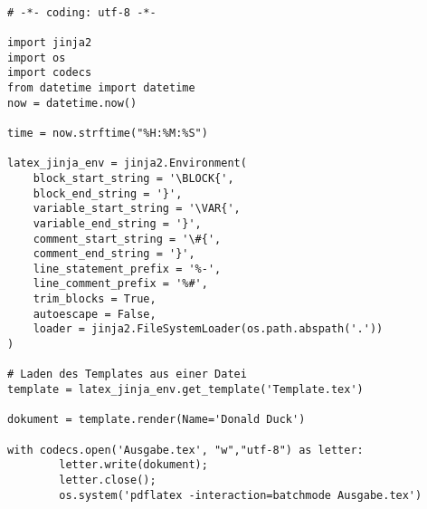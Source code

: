 \documentclass{article}
\begin{document}
\begin{verbatim}

# -*- coding: utf-8 -*-

import jinja2
import os
import codecs
from datetime import datetime
now = datetime.now()

time = now.strftime("%H:%M:%S")

latex_jinja_env = jinja2.Environment(
    block_start_string = '\BLOCK{',
    block_end_string = '}',
    variable_start_string = '\VAR{',
    variable_end_string = '}',
    comment_start_string = '\#{',
    comment_end_string = '}',
    line_statement_prefix = '%-',
    line_comment_prefix = '%#',
    trim_blocks = True,
    autoescape = False,
    loader = jinja2.FileSystemLoader(os.path.abspath('.'))
)

# Laden des Templates aus einer Datei
template = latex_jinja_env.get_template('Template.tex')

dokument = template.render(Name='Donald Duck')

with codecs.open('Ausgabe.tex', "w","utf-8") as letter:
        letter.write(dokument);
        letter.close();
        os.system('pdflatex -interaction=batchmode Ausgabe.tex')



\end{verbatim}
\end{document}
